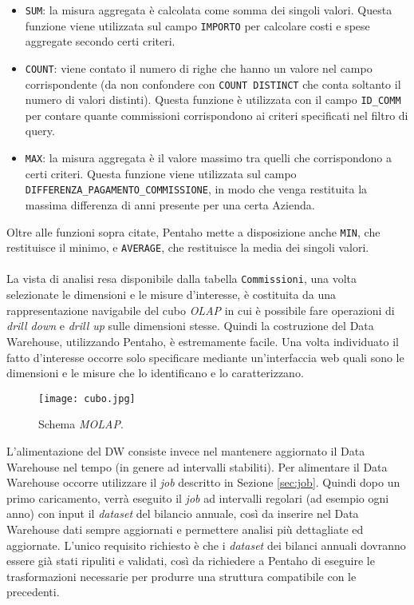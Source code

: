 	\begin{itemize}
		\item \texttt{SUM}: la misura aggregata è calcolata come somma dei singoli valori. Questa funzione viene utilizzata sul campo \texttt{IMPORTO} per calcolare costi e spese aggregate secondo certi criteri.
		\item \texttt{COUNT}: viene contato il numero di righe che hanno un valore nel campo corrispondente (da non confondere con \texttt{COUNT DISTINCT} che conta soltanto il numero di valori distinti). Questa funzione è utilizzata con il campo \texttt{ID\_COMM} per contare quante commissioni corrispondono ai criteri specificati nel filtro di query.
		\item \texttt{MAX}: la misura aggregata è il valore massimo tra quelli che corrispondono a certi criteri. Questa funzione viene utilizzata sul campo \texttt{DIFFERENZA\_PAGAMENTO\_COMMISSIONE}, in modo che venga restituita la massima differenza di anni presente per una certa Azienda.
	\end{itemize}
	
	Oltre alle funzioni sopra citate, Pentaho mette a disposizione anche \texttt{MIN}, che restituisce il minimo, e \texttt{AVERAGE}, che restituisce la media dei singoli valori.\\
	\\	
	La vista di analisi resa disponibile dalla tabella \texttt{Commissioni}, una volta selezionate le dimensioni e le misure d'interesse, è costituita da una rappresentazione navigabile del cubo \textit{OLAP} in cui è possibile fare operazioni di \textit{drill down} e \textit{drill up} sulle dimensioni stesse. Quindi la costruzione del Data Warehouse, utilizzando Pentaho, è estremamente facile. Una volta individuato il fatto d'interesse occorre solo specificare mediante un'interfaccia web quali sono le dimensioni e le misure che lo identificano e lo caratterizzano.\\
	
	\begin{figure}[h!]
		\centering
			\texttt{[image: cubo.jpg]}
		\caption{Schema \textit{MOLAP}.}
		\label{fig:cubo1}
	\end{figure}
	
	L'alimentazione del DW consiste invece nel mantenere aggiornato il Data Warehouse nel tempo (in genere ad intervalli stabiliti). Per alimentare il Data Warehouse occorre utilizzare il \textit{job} descritto in Sezione \ref{sec:job}. Quindi dopo un primo caricamento, verrà eseguito il \textit{job} ad intervalli regolari (ad esempio ogni anno) con input il \textit{dataset} del bilancio annuale, così da inserire nel Data Warehouse dati sempre aggiornati e permettere analisi più dettagliate ed aggiornate. L'unico requisito richiesto è che i \textit{dataset} dei bilanci annuali dovranno essere già stati ripuliti e validati, così da richiedere a Pentaho di eseguire le trasformazioni necessarie per produrre una struttura compatibile con le precedenti.

